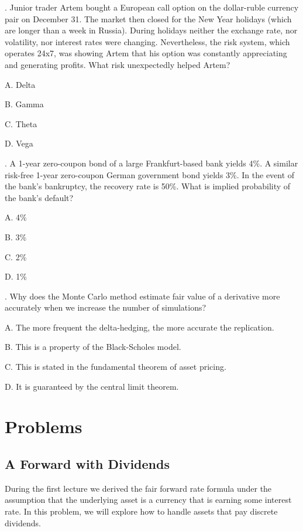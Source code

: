 \documentclass[a4paper,14pt]{extarticle}
\begin{document}
. Junior trader Artem bought a European call option on the dollar-ruble currency pair on December 31. The market then closed for the New Year holidays (which are longer than a week in Russia). During holidays neither the exchange rate, nor volatility, nor interest rates were changing. Nevertheless, the risk system, which operates 24x7, was showing Artem that his option was constantly appreciating and generating profits. What risk unexpectedly helped Artem?

A. Delta

B. Gamma

C. Theta

D. Vega

\vspace{\baselineskip}

. A 1-year zero-coupon bond of a large Frankfurt-based bank yields 4\%. A similar risk-free 1-year zero-coupon German  government bond yields 3\%. In the event of the bank's bankruptcy, the recovery rate is 50\%. What is implied probability of the bank's default?

A. 4\%

B. 3\%

C. 2\%

D. 1\%

\vspace{\baselineskip}

. Why does the Monte Carlo method estimate fair value of a derivative more accurately when we increase the number of simulations?

A. The more frequent the delta-hedging, the more accurate the replication.

B. This is a property of the Black-Scholes model.

C. This is stated in the fundamental theorem of asset pricing.

D. It is guaranteed by the central limit theorem.

\section{Problems} 

\subsection{A Forward with Dividends}

During the first lecture we derived the fair forward rate formula under the assumption that the underlying asset is a currency that is earning some interest rate. In this problem, we will explore how to handle assets that pay discrete dividends.
\end{document}
